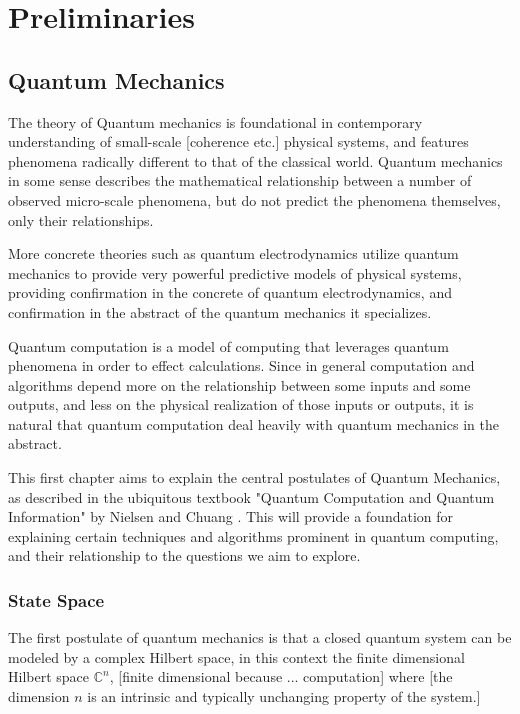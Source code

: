 

\chapter[PRELIMINARIES]{Preliminaries}
\label{Chap:Intro}


\section{Quantum Mechanics}

The theory of Quantum mechanics is foundational in contemporary understanding of small-scale [coherence etc.] physical systems, and features phenomena radically different to that of the classical world. Quantum mechanics in some sense describes the mathematical relationship between a number of observed micro-scale phenomena, but do not predict the phenomena themselves, only their relationships.

More concrete theories such as quantum electrodynamics utilize quantum mechanics to provide very powerful predictive models of physical systems, providing confirmation in the concrete of quantum electrodynamics, and confirmation in the abstract of the quantum mechanics it specializes.

Quantum computation is a model of computing that leverages quantum phenomena in order to effect calculations. Since in general computation and algorithms depend more on the relationship between some inputs and some outputs, and less on the physical realization of those inputs or outputs, it is natural that quantum computation deal heavily with quantum mechanics in the abstract.

This first chapter aims to explain the central postulates of Quantum Mechanics, as described in the ubiquitous textbook "Quantum Computation and Quantum Information" by Nielsen and Chuang \cite{textbook}. This will provide a foundation for explaining certain techniques and algorithms prominent in quantum computing, and their relationship to the questions we aim to explore.
\subsection{State Space}
The first postulate of quantum mechanics is that a closed quantum system can be modeled by a complex Hilbert space, in this context the finite dimensional Hilbert space $\mathbb{C}^n$, [finite dimensional because ... computation] where [the dimension $n$ is an intrinsic and typically unchanging property of the system.]

